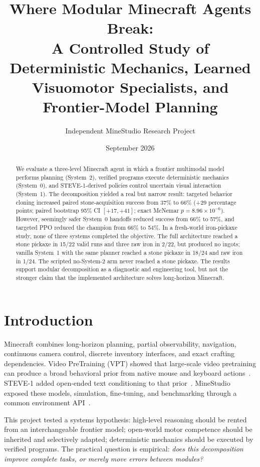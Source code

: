 \documentclass[10pt,twocolumn]{article}
\title{\textbf{Where Modular Minecraft Agents Break:}\\A Controlled Study of Deterministic Mechanics, Learned Visuomotor Specialists, and Frontier-Model Planning}
\author{Independent MineStudio Research Project}
\date{September 2026}
\begin{document}
\maketitle

\begin{abstract}
We evaluate a three-level Minecraft agent in which a frontier multimodal model performs planning (System~2), verified programs execute deterministic mechanics (System~0), and STEVE-1-derived policies control uncertain visual interaction (System~1). The decomposition yielded a real but narrow result: targeted behavior cloning increased paired stone-acquisition success from 37\% to 66\% (+29 percentage points; paired bootstrap 95\% CI $[+17,+41]$; exact McNemar $p=8.96\times10^{-6}$). However, seemingly safer System~0 handoffs reduced success from 66\% to 57\%, and targeted PPO reduced the champion from 66\% to 54\%. In a fresh-world iron-pickaxe study, none of three systems completed the objective. The full architecture reached a stone pickaxe in 15/22 valid runs and three raw iron in 2/22, but produced no ingots; vanilla System~1 with the same planner reached a stone pickaxe in 18/24 and raw iron in 1/24. The scripted no-System-2 arm never reached a stone pickaxe. The results support modular decomposition as a diagnostic and engineering tool, but not the stronger claim that the implemented architecture solves long-horizon Minecraft.
\end{abstract}

\section{Introduction}
Minecraft combines long-horizon planning, partial observability, navigation, continuous camera control, discrete inventory interfaces, and exact crafting dependencies. Video PreTraining (VPT) showed that large-scale video pretraining can produce a broad behavioral prior from native mouse and keyboard actions~\cite{vpt}. STEVE-1 added open-ended text conditioning to that prior~\cite{steve}. MineStudio exposed these models, simulation, fine-tuning, and benchmarking through a common environment API~\cite{minestudio}.

This project tested a systems hypothesis: high-level reasoning should be rented from an interchangeable frontier model; open-world motor competence should be inherited and selectively adapted; deterministic mechanics should be executed by verified programs. The practical question is empirical: \emph{does this decomposition improve complete tasks, or merely move errors between modules?}
\end{document}
